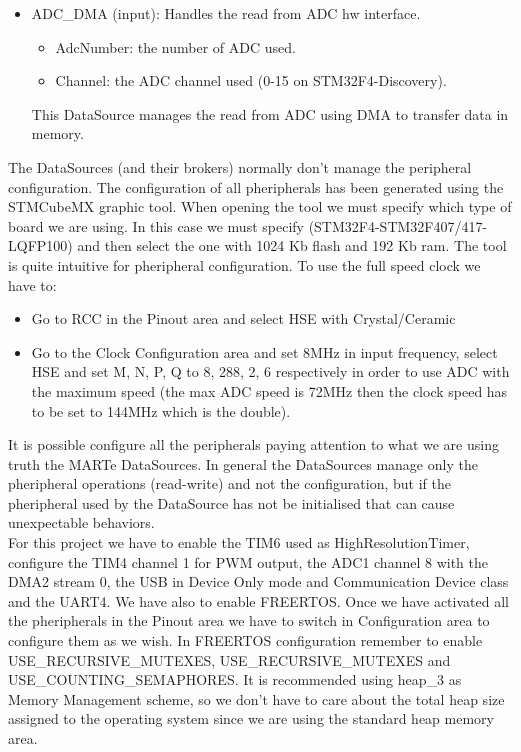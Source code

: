 \begin{itemize}
	\item ADC\_DMA (input): Handles the read from ADC hw interface.
	      \begin{itemize}
          \item AdcNumber: the number of ADC used.
          \item Channel: the ADC channel used (0-15 on STM32F4-Discovery).
          \end{itemize}
	This DataSource manages the read from ADC using DMA to transfer data in memory.
   \end{itemize}
   
   The DataSources (and their brokers) normally don't manage the peripheral configuration. The configuration of all pheripherals has been generated using the STMCubeMX graphic tool. When opening the tool we must specify which type of board we are using. In this case we must specify (STM32F4-STM32F407/417-LQFP100) and then select the one with 1024 Kb flash and 192 Kb ram. The tool is quite intuitive for pheripheral configuration. To use the full speed clock we have to:
   \begin{itemize}
   	\item Go to RCC in the Pinout area and select HSE with Crystal/Ceramic
   	\item Go to the Clock Configuration area and set 8MHz in input frequency, select HSE and set M, N, P, Q to 8, 288, 2, 6 respectively in order to use ADC with the maximum speed (the max ADC speed is 72MHz then the clock speed has to be set to 144MHz which is the double).
   	\end{itemize}
   	It is possible configure all the peripherals paying attention to what we are using truth the MARTe DataSources. In general the DataSources manage only the pheripheral operations (read-write) and not the configuration, but if the pheripheral used by the DataSource has not be initialised that can cause unexpectable behaviors.\\
   	For this project we have to enable the TIM6 used as HighResolutionTimer, configure the TIM4 channel 1 for PWM output, the ADC1 channel 8 with the DMA2 stream 0, the USB in Device Only mode and Communication Device class and the UART4. We have also to enable FREERTOS. Once we have activated all the pheripherals in the Pinout area we have to switch in Configuration area to configure them as we wish. In FREERTOS configuration remember to enable USE\_RECURSIVE\_MUTEXES, USE\_RECURSIVE\_MUTEXES and USE\_COUNTING\_SEMAPHORES. It is recommended using heap\_3 as Memory Management scheme, so we don't have to care about the total heap size assigned to the operating system since we are using the standard heap memory area.\\
